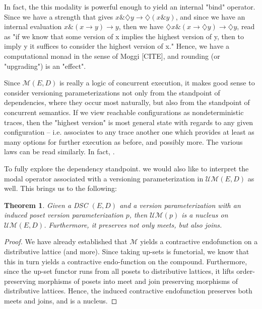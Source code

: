 \documentclass[hoptionsi,review,format=acmsmall]{acmart}
\newtheorem{theorem}{Theorem}[section]
\theoremstyle{definition}
\newcommand{\Mcc}{\mathcal{M}}
\newcommand{\UMc}{\mathcal{UM}}
\newcommand{\band}{\mathbin{\&}}
\newcommand{\Dia}{\diamondsuit}
\begin{document}
In fact, the this modality is powerful enough to yield an internal "bind" operator. Since we have a strength that gives \(x \band \Dia{y} \rightarrow \Dia(x \band y)\), and since we have an internal evaluation \(x \band (x \rightarrow y) \rightarrow y\), then we have \(\Dia{x} \band (x \rightarrow \Dia{y}) \rightarrow \Dia{y}\), read as "if we know that some version of x implies the highest version of y, then to imply y it suffices to consider the highest version of x." Hence, we have a computational monad in the sense of Moggi [CITE], and rounding (or "upgrading") is an "effect".


Since \(\Mcc(E,D)\) is really a logic of concurrent execution, it makes good sense to consider versioning parameterizations not only from the standpoint of dependencies, where they occur most naturally, but also from the standpoint of concurrent semantics. If we view reachable configurations as nondeterministic traces, then the "highest version" is most general state with regards to any given configuration -- i.e. associates to any trace another one which provides at least as many options for further execution as before, and possibly more. The various laws can be read similarly. In fact, .

To fully explore the dependency standpoint. we would also like to interpret the modal operator associated with a versioning parameterization in \(\UMc(E,D)\) as well. This brings us to the following:

\begin{theorem}
Given a DSC \((E,D)\) and a version parameterization with an induced poset version parameterization \(p\), then \(\UMc(p)\) is a nucleus on \(\UMc(E,D)\). Furthermore, it preserves not only meets, but also joins.
\end{theorem}
\begin{proof}
We have already established that \(\Mcc\) yields a contractive endofunction on a distributive lattice (and more). Since taking up-sets is functorial, we know that this in turn yields a contractive endo-function on the compound. Furthermore, since the up-set functor runs from all posets to distributive lattices, it lifts order-preserving morphisms of posets into meet and join preserving morphisms of distributive lattices. Hence, the induced contractive endofunction preserves both meets and joins, and is a nucleus.
\end{proof}
\end{document}
